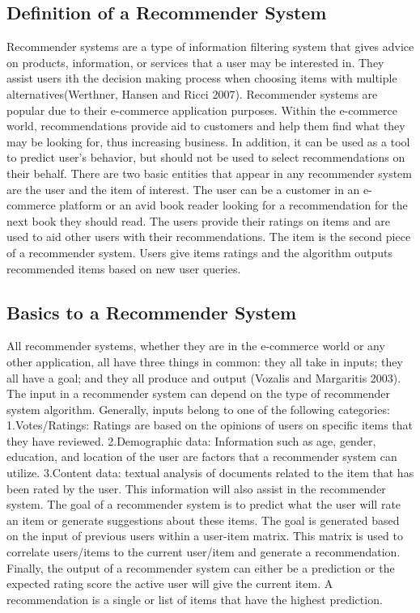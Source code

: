 \subsection{Definition of a Recommender System}
Recommender systems are a type of information filtering system that gives advice on products, information, or services that a user may be interested in. They assist users ith the decision making process when choosing items with multiple alternatives(Werthner, Hansen and Ricci 2007). Recommender systems are popular due to their e-commerce application purposes. Within the e-commerce world, recommendations provide aid to customers and help them find what they may be looking for, thus increasing business. In addition, it can be used as a tool to predict user's behavior, but should not be used to select recommendations on their behalf.
There are two basic entities that appear in any recommender system are the user and the item of interest. The user can be a customer in an e-commerce platform or an avid book reader looking for a recommendation for the next book they should read. The users provide their ratings on items and are used to aid other users with their recommendations. The item is the second piece of a recommender system. Users give items ratings and the algorithm outputs recommended items based on new user queries.
\subsection{Basics to a Recommender System}
All recommender systems, whether they are in the e-commerce world or any other application, all have three things in common: they all take in inputs; they all have a goal; and they all produce and output (Vozalis and Margaritis 2003).
The input in a recommender system can depend on the type of recommender system algorithm. Generally, inputs belong to one of the following categories:
1.Votes/Ratings: Ratings are based on the opinions of users on specific items that they have reviewed.
2.Demographic data: Information such as age, gender, education, and location of the user are factors that a recommender system can utilize.
3.Content data: textual analysis of documents related to the item that has been rated by the user. This information will also assist in the recommender system.
The goal of a recommender system is to predict what the user will rate an item or generate suggestions about these items. The goal is generated based on the input of previous users within a user-item matrix. This matrix is used to correlate users/items to the current user/item and generate a recommendation. 
Finally, the output of a recommender system can either be a prediction or the expected rating score the active user will give the current item. A recommendation is a single or list of items that have the highest prediction.
